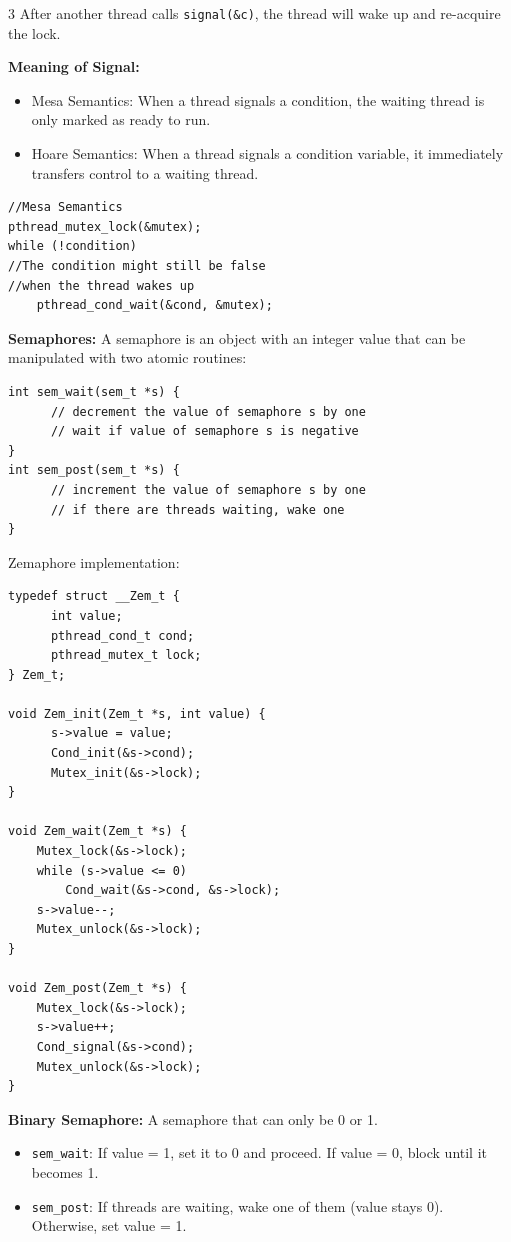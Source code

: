\documentclass[8pt]{innovativeinnovation-cheatsheet}
\begin{document}
\begin{multicols*}{3}
After another thread calls \texttt{signal(\&c)}, the thread will wake up and re-acquire the lock.

\textbf{Meaning of Signal: }
\begin{itemize}
      \item Mesa Semantics: When a thread signals a condition, the waiting thread is only marked as ready to run. 
      \item Hoare Semantics: When a thread signals a condition variable, it immediately transfers control to a waiting thread.
\end{itemize}
\begin{lstlisting}
//Mesa Semantics
pthread_mutex_lock(&mutex);
while (!condition) 
//The condition might still be false 
//when the thread wakes up
    pthread_cond_wait(&cond, &mutex);
\end{lstlisting}

\textbf{Semaphores:}
A semaphore is an object with an integer value that can be manipulated with two atomic routines:

\begin{lstlisting}
int sem_wait(sem_t *s) {
      // decrement the value of semaphore s by one
      // wait if value of semaphore s is negative
}
int sem_post(sem_t *s) {
      // increment the value of semaphore s by one
      // if there are threads waiting, wake one
}
\end{lstlisting}
Zemaphore implementation:
\begin{lstlisting}
typedef struct __Zem_t {
      int value;
      pthread_cond_t cond;
      pthread_mutex_t lock;
} Zem_t;

void Zem_init(Zem_t *s, int value) {
      s->value = value;
      Cond_init(&s->cond);
      Mutex_init(&s->lock);
}

void Zem_wait(Zem_t *s) {
    Mutex_lock(&s->lock);
    while (s->value <= 0)
        Cond_wait(&s->cond, &s->lock);
    s->value--;
    Mutex_unlock(&s->lock);
}

void Zem_post(Zem_t *s) {
    Mutex_lock(&s->lock);
    s->value++;
    Cond_signal(&s->cond);
    Mutex_unlock(&s->lock);
}

\end{lstlisting}

\textbf{Binary Semaphore:} A semaphore that can only be 0 or 1.
\begin{itemize}
      \item \texttt{sem\_wait}: If value = 1, set it to 0 and proceed. If value = 0, block until it becomes 1.
      \item \texttt{sem\_post}: If threads are waiting, wake one of them (value stays 0). Otherwise, set value = 1.
\end{itemize}


\end{multicols*}
\end{document}
